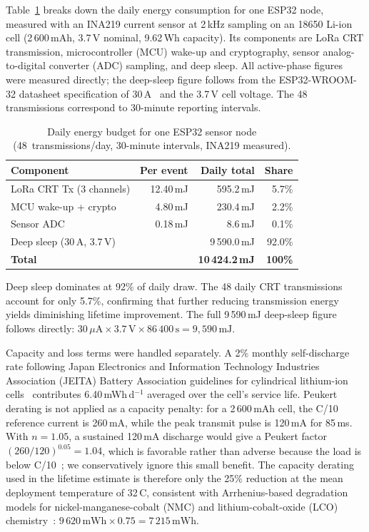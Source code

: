 \documentclass[a4paper,fleqn]{cas-dc}
\begin{document}
Table~\ref{tab:energy_budget} breaks down the daily energy consumption
for one ESP32 node, measured with an INA219 current sensor at 2\,kHz
sampling on an 18650 Li-ion cell (2\,600\,mAh, 3.7\,V nominal,
9.62\,Wh capacity). Its components are LoRa CRT transmission,
microcontroller (MCU) wake-up and cryptography, sensor analog-to-digital
converter (ADC) sampling, and deep sleep. All active-phase figures were
measured directly;
the deep-sleep figure follows from the ESP32-WROOM-32 datasheet
specification of 30\,\textmu{}A~\cite{esp32_datasheet} and the
3.7\,V cell voltage. The
48 transmissions correspond to 30-minute reporting intervals.

\begin{table}[pos=t]
\caption{Daily energy budget for one ESP32 sensor node
  (48~transmissions/day, 30-minute intervals, INA219 measured).}
\label{tab:energy_budget}
\begin{tabularx}{\tblwidth}{@{}Xrrr@{}}
\toprule
Component & Per event & Daily total & Share \\
\midrule
LoRa CRT Tx (3 channels) & 12.40\,mJ & 595.2\,mJ &  5.7\% \\
MCU wake-up + crypto      &  4.80\,mJ & 230.4\,mJ &  2.2\% \\
Sensor ADC                &  0.18\,mJ &   8.6\,mJ &  0.1\% \\
Deep sleep (30\,\textmu{}A, 3.7\,V) & {} & 9\,590.0\,mJ & 92.0\% \\
\midrule
\textbf{Total}            & {} & \textbf{10\,424.2\,mJ} & \textbf{100\%} \\
\bottomrule
\end{tabularx}
\end{table}

Deep sleep dominates at 92\% of daily draw. The 48 daily CRT
transmissions account for only 5.7\%, confirming that further
reducing transmission energy yields diminishing lifetime improvement.
The full 9\,590\,mJ deep-sleep figure follows directly:
$30\,\mu\text{A} \times 3.7\,\text{V} \times 86\,400\,\text{s}
= 9{,}590\,\text{mJ}$.

Capacity and loss terms were handled separately. A 2\% monthly
self-discharge rate following Japan Electronics and Information
Technology Industries Association (JEITA) Battery Association guidelines
for cylindrical lithium-ion cells~\cite{jeita2017battery} contributes
6.40\,mWh\,d$^{-1}$ averaged over the cell's service life. Peukert
derating is not applied as a capacity penalty: for a 2\,600\,mAh cell,
the C/10 reference current is 260\,mA, while the peak transmit pulse is
120\,mA for 85\,ms. With $n{=}1.05$, a sustained 120\,mA discharge would
give a Peukert factor $(260/120)^{0.05}=1.04$, which is favorable rather
than adverse because the load is below C/10~\cite{hausmann2013peukert};
we conservatively ignore this small benefit. The capacity derating used
in the lifetime estimate is therefore only the 25\% reduction at the
mean deployment temperature of 32\,\textdegree{}C, consistent with
Arrhenius-based degradation models for nickel-manganese-cobalt (NMC)
and lithium-cobalt-oxide (LCO) chemistry~\cite{vetter2005ageing,broussely2005aging}:
$9\,620\,\text{mWh} \times 0.75 = 7\,215\,\text{mWh}$.
\end{document}
